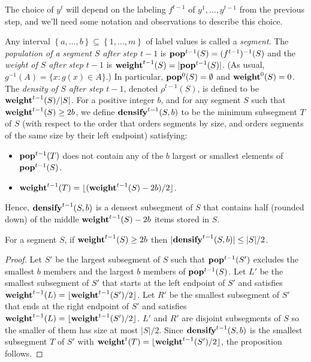 \documentclass[unicode,review]{siamart1116}
\newcommand{\natInt}[2]{ \left\{ #1, \dotsc, #2 \right\} }
\newcommand{\pop}{{\rm {\bf pop}}}
\newcommand{\weight}{{\rm {\bf weight}}}
\newcommand{\densify}{{\rm {\bf densify}}}
\numberwithin{theorem}{section}
\begin{document}
The choice of $y^t$ will depend on
the labeling $f^{t-1}$ of $y^1,\ldots,y^{t-1}$ from the previous step, and we'll need some notation and
observations to describe this choice.   

Any interval $\natInt{a}{b} \subseteq \natInt{1}{m}$ of label values is called a \emph{segment}.
The \emph{population of a segment $S$ after step $t-1$} is $\pop^{t-1}(S) = (f^{t-1})^{-1}(S)$ and the
\emph{weight of $S$ after step $t-1$} is $\weight^{t-1}(S) = |\pop^{t-1}(S)|$. (As usual, $g^{-1}(A) = \{ x : g(x) \in A \}$.)
In particular,  $\pop^0(S) = \emptyset$ and $\weight^0(S) = 0$.
The \emph{density of $S$ after step $t-1$}, denoted $\rho^{t-1}(S)$, is defined to be $\weight^{t-1}(S) / |S|$. For a positive
integer $b$, and for any segment $S$ such that $\weight^{t-1}(S) \geq 2b$, we define
$\densify^{t-1}(S,b)$ to be the minimum  subsegment $T$ of $S$ (with respect to the order that
orders segments by size, and orders segments of the same size by their left endpoint) satisfying:

\begin{itemize}
\item $\pop^{t-1}(T)$ does not contain any of the  $b$ largest or smallest elements of $\pop^{t-1}(S)$.
\item  $\weight^{t-1}(T)=\lfloor (\weight^{t-1}(S)-2b)/2 \rfloor$.
\end{itemize} 

Hence, $\densify^{t-1}(S,b)$ is a densest subsegment of $S$ that contains half (rounded down)  of the middle $\weight^{t-1}(S)-2b$ items
stored in $S$.


\iffalse
These $b$ items on either side of $T$ form the left and right buffers described in \cref{s-1.1}.
\fi
\begin{proposition}
\label{prop:shrinks}
For a segment $S$, if $\weight^{t-1}(S) \geq 2b$ then $|\densify^{t-1}(S,b)| \leq |S|/2$.
\end{proposition}

\begin{proof}
Let $S'$ be the largest subsegment of $S$ such that $\pop^{t-1}(S')$ excludes the
smallest $b$  members and the largest $b$ members of $\pop^{t-1}(S)$.  
Let $L'$ be the smallest subsegment of $S'$ that starts at the left endpoint of $S'$
and satisfies  $\weight^{t-1}(L)=\lfloor \weight^{t-1}(S')/2 \rfloor$.  Let $R'$
 be the smallest subsegment of $S'$ that ends at the right endpoint of $S'$
and satisfies  $\weight^{t-1}(L)=\lfloor \weight^{t-1}(S')/2 \rfloor$.
$L'$ and $R'$ are disjoint subsegments of $S$ so the smaller of them has
size at most $|S|/2$. Since $\densify^{t-1}(S,b)$ is the smallest subsegment $T$ of $S'$ with
$\weight^t(T) = \lfloor \weight^{t-1}(S')/2 \rfloor$, the proposition follows.
\end{proof} 
\end{document}
